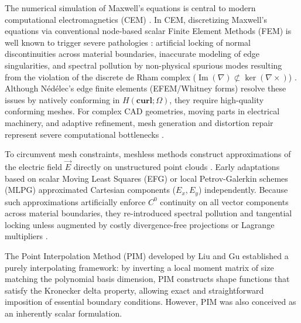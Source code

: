 \documentclass[preprint,12pt]{elsarticle}
\begin{document}
The numerical simulation of Maxwell's equations is central to modern computational electromagnetics (CEM) \cite{jin2014finite, harrington2001time, monk2003finite}. In CEM, discretizing Maxwell's equations via conventional node-based scalar Finite Element Methods (FEM) is well known to trigger severe pathologies \cite{jin2014finite, bossavit1998computational}: artificial locking of normal discontinuities across material boundaries, inaccurate modeling of edge singularities, and spectral pollution by non-physical spurious modes resulting from the violation of the discrete de Rham complex ($\operatorname{Im}(\nabla) \not\subset \ker(\nabla \times)$) \cite{bossavit1990spurious, boffi1999computational, boffi2013mixed}. Although N\'ed\'elec's edge finite elements (EFEM/Whitney forms) \cite{nedelec1980mixed, monk2003finite} resolve these issues by natively conforming in $H(\mathbf{curl}; \Omega)$, they require high-quality conforming meshes. For complex CAD geometries, moving parts in electrical machinery, and adaptive refinement, mesh generation and distortion repair represent severe computational bottlenecks \cite{idelsohn2006mesh, liu2009mesh, slak2018refined}.

To circumvent mesh constraints, meshless methods construct approximations of the electric field $\vec{E}$ directly on unstructured point clouds \cite{liu2009mesh, belytschko1994element}. Early adaptations based on scalar Moving Least Squares (EFG) or local Petrov-Galerkin schemes (MLPG) \cite{viana1999moving, cingoski1998element, atluri2002meshless, fonseca2008imposing, nicomedes2012meshless} approximated Cartesian components ($E_x, E_y$) independently. Because such approximations artificially enforce $C^0$ continuity on all vector components across material boundaries, they re-introduced spectral pollution and tangential locking unless augmented by costly divergence-free projections or Lagrange multipliers \cite{nicomedes2015mixed, lima2016metodos}.

The Point Interpolation Method (PIM) developed by Liu and Gu \cite{liu2001point} established a purely interpolating framework: by inverting a local moment matrix of size matching the polynomial basis dimension, PIM constructs shape functions that satisfy the Kronecker delta property, allowing exact and straightforward imposition of essential boundary conditions. However, PIM was also conceived as an inherently scalar formulation.
\end{document}
